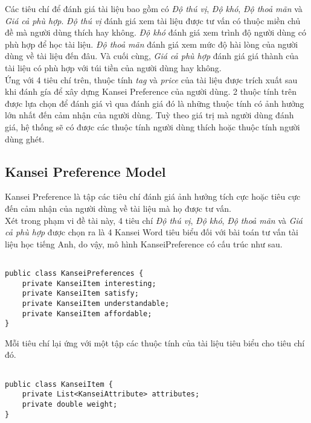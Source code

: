 Các tiêu chí để đánh giá tài liệu bao gồm có \textit{Độ thú vị}, \textit{Độ khó}, \textit{Độ thoả mãn} và \textit{Giá cả phù hợp}. \textit{Độ thú vị} đánh giá xem tài liệu được tư vấn có thuộc miền chủ đề mà người dùng thích hay không. \textit{Độ khó} đánh giá xem trình độ người dùng có phù hợp để học tài liệu. \textit{Độ thoả mãn} đánh giá xem mức độ hài lòng của người dùng về tài liệu đến đâu. Và cuối cùng, \textit{Giá cả phù hợp} đánh giá giá thành của tài liệu có phù hợp với túi tiền của người dùng hay không.\\

Ứng với 4 tiêu chí trên, thuộc tính \textit{tag} và \textit{price} của tài liệu được trích xuất sau khi đánh gía để xây dựng Kansei Preference của người dùng. 2 thuộc tính trên được lựa chọn để đánh giá vì qua đánh giá đó là những thuộc tính có ảnh hưởng lớn nhất đến cảm nhận của người dùng. Tuỳ theo giá trị mà người dùng đánh giá, hệ thống sẽ có được các thuộc tính người dùng thích hoặc thuộc tính người dùng ghét.\\

\subsection{Kansei Preference Model}

Kansei Preference là tập các tiêu chí đánh giá ảnh hưởng tích cực hoặc tiêu cực đến cảm nhận của người dùng về tài liệu mà họ được tư vấn.\\

Xét trong phạm vi đề tài này, 4 tiêu chí \textit{Độ thú vị}, \textit{Độ khó}, \textit{Độ thoả mãn} và \textit{Giá cả phù hợp} được chọn ra là 4 Kansei Word tiêu biểu đối với bài toán tư vấn tài liệu học tiếng Anh, do vậy, mô hình KanseiPreference có cấu trúc như sau.    

\begin{lstlisting}[style=javacode, breaklines=true]

public class KanseiPreferences {
    private KanseiItem interesting;
    private KanseiItem satisfy;
    private KanseiItem understandable;
    private KanseiItem affordable;
}
\end{lstlisting}

Mỗi tiêu chí lại ứng với một tập các thuộc tính của tài liệu tiêu biểu cho tiêu chí đó.

\begin{lstlisting}[style=javacode, breaklines=true]

public class KanseiItem {
    private List<KanseiAttribute> attributes;
    private double weight;
}

\end{lstlisting}

